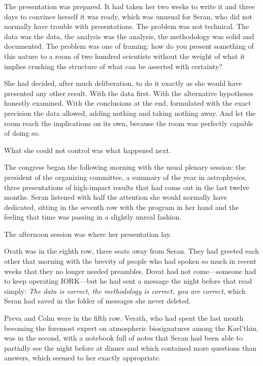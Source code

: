 \documentclass[11pt,a5paper,twoside]{book}
\begin{document}
The presentation was prepared. It had taken her two weeks to write it and three days to convince herself it was ready, which was unusual for Seran, who did not normally have trouble with presentations. The problem was not technical. The data was the data, the analysis was the analysis, the methodology was solid and documented. The problem was one of framing: how do you present something of this nature to a room of two hundred scientists without the weight of what it implies crushing the structure of what can be asserted with certainty?

She had decided, after much deliberation, to do it exactly as she would have presented any other result. With the data first. With the alternative hypotheses honestly examined. With the conclusions at the end, formulated with the exact precision the data allowed, adding nothing and taking nothing away. And let the room reach the implications on its own, because the room was perfectly capable of doing so.

What she could not control was what happened next.

The congress began the following morning with the usual plenary session: the president of the organizing committee, a summary of the year in astrophysics, three presentations of high-impact results that had come out in the last twelve months. Seran listened with half the attention she would normally have dedicated, sitting in the seventh row with the program in her hand and the feeling that time was passing in a slightly unreal fashion.

The afternoon session was where her presentation lay.

Orath was in the eighth row, three seats away from Seran. They had greeted each other that morning with the brevity of people who had spoken so much in recent weeks that they no longer needed preambles. Dovat had not come—someone had to keep operating IORK—but he had sent a message the night before that read simply: \textit{The data is correct, the methodology is correct, you are correct}, which Seran had saved in the folder of messages she never deleted.

Preva and Colm were in the fifth row. Verath, who had spent the last month becoming the foremost expert on atmospheric biosignatures among the Kael'thin, was in the second, with a notebook full of notes that Seran had been able to partially see the night before at dinner and which contained more questions than answers, which seemed to her exactly appropriate.
\end{document}

